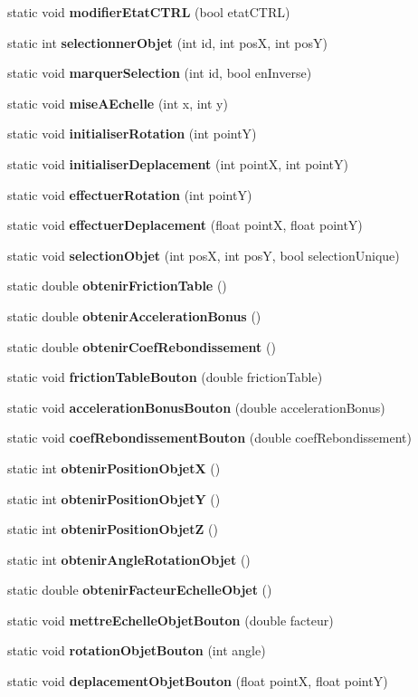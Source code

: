 \begin{DoxyCompactItemize}
\item 
static void {\bfseries modifier\+Etat\+C\+T\+RL} (bool etat\+C\+T\+RL)
\item 
static int {\bfseries selectionner\+Objet} (int id, int posX, int posY)
\item 
static void {\bfseries marquer\+Selection} (int id, bool en\+Inverse)
\item 
static void {\bfseries mise\+A\+Echelle} (int x, int y)
\item 
static void {\bfseries initialiser\+Rotation} (int pointY)
\item 
static void {\bfseries initialiser\+Deplacement} (int pointX, int pointY)
\item 
static void {\bfseries effectuer\+Rotation} (int pointY)
\item 
static void {\bfseries effectuer\+Deplacement} (float pointX, float pointY)
\item 
static void {\bfseries selection\+Objet} (int posX, int posY, bool selection\+Unique)
\item 
static double {\bfseries obtenir\+Friction\+Table} ()
\item 
static double {\bfseries obtenir\+Acceleration\+Bonus} ()
\item 
static double {\bfseries obtenir\+Coef\+Rebondissement} ()
\item 
static void {\bfseries friction\+Table\+Bouton} (double friction\+Table)
\item 
static void {\bfseries acceleration\+Bonus\+Bouton} (double acceleration\+Bonus)
\item 
static void {\bfseries coef\+Rebondissement\+Bouton} (double coef\+Rebondissement)
\item 
static int {\bfseries obtenir\+Position\+ObjetX} ()
\item 
static int {\bfseries obtenir\+Position\+ObjetY} ()
\item 
static int {\bfseries obtenir\+Position\+ObjetZ} ()
\item 
static int {\bfseries obtenir\+Angle\+Rotation\+Objet} ()
\item 
static double {\bfseries obtenir\+Facteur\+Echelle\+Objet} ()
\item 
static void {\bfseries mettre\+Echelle\+Objet\+Bouton} (double facteur)
\item 
static void {\bfseries rotation\+Objet\+Bouton} (int angle)
\item 
static void {\bfseries deplacement\+Objet\+Bouton} (float pointX, float pointY)
\item 

\end{DoxyCompactItemize}
